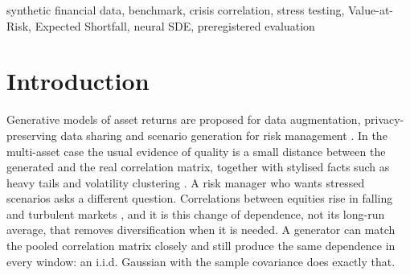 \documentclass[journal]{IEEEtran}
\newcommand{\pendingnum}{\textit{n/a}}
\providecommand{\nRiskGenerators}{\pendingnum}
\providecommand{\nAblationVariants}{\pendingnum}
\providecommand{\tauBCusHeldPrereg}{\pendingnum}
\providecommand{\tauBCkrHeldPrereg}{\pendingnum}
\providecommand{\tauRiskB}{\pendingnum}
\providecommand{\tauRiskBLo}{\pendingnum}
\providecommand{\tauRiskBHi}{\pendingnum}
\providecommand{\tauRiskC}{\pendingnum}
\providecommand{\tauRiskCLo}{\pendingnum}
\providecommand{\tauRiskCHi}{\pendingnum}
\providecommand{\scoreCCgnsdeTwoFull}{\pendingnum}
\providecommand{\scoreCCgnsdeTwoHeld}{\pendingnum}
\providecommand{\verdictGThree}{\pendingnum}
\begin{document}
\begin{abstract}
$\tau_{B,C}$ is below 0.3 on both the US ($\tauBCusHeldPrereg$) and Korea ($\tauBCkrHeldPrereg$). On the
downstream out-of-sample Value-at-Risk and Expected-Shortfall backtest over all \nRiskGenerators\ valid
generators (including three completed full-scale CUDA baselines alongside the preregistered panel, with TimeVAE
excluded for negative Expected Shortfall), family-C rank achieves $\tau = \tauRiskC\,[\tauRiskCLo,\tauRiskCHi]$
against FZ0 loss versus $\tau = \tauRiskB\,[\tauRiskBLo,\tauRiskBHi]$ for family~B: because the 95\%
bootstrap intervals do not overlap (\tauRiskCLo > \tauRiskBHi), gate~G3 is \verdictGThree\ under the strict non-overlap rule. As a case
study inside the benchmark, we document the preregistered latent neural SDE (CG-NSDE v1), which failed G1 and
G2, and a disclosed \emph{post hoc} revision (CG-NSDE v2) with \nAblationVariants\ component ablations. CG-NSDE
v2 (post hoc) leads family~C on NSE (\scoreCCgnsdeTwoFull\ in-sample) and ranks second among synthetic
generators on equal-weight VaR/ES FZ0 loss behind full-scale CUDA QuantGAN, yet degrades fivefold
out-of-sample (\scoreCCgnsdeTwoHeld) and, like every generator in the panel, fails held-out gate~G2 across
both evaluable stress episodes. Controlled checks further show that the boost statistic is compressed and
non-zero on a no-regime GARCH null. These checks leave the benchmark protocol and its mixed empirical findings
as the primary contribution.
\end{abstract}

\begin{IEEEkeywords}
synthetic financial data, benchmark, crisis correlation, stress testing, Value-at-Risk, Expected Shortfall,
neural SDE, preregistered evaluation
\end{IEEEkeywords}

\section{Introduction}
Generative models of asset returns are proposed for data augmentation, privacy-preserving data sharing and
scenario generation for risk management \cite{assefa2020synthetic,potluru2023synthetic,eckerli2021gans}. In the
multi-asset case the usual evidence of quality is a small distance between the generated and the real
correlation matrix, together with stylised facts such as heavy tails and volatility clustering
\cite{cont2001stylized}. A risk manager who wants stressed scenarios asks a different question. Correlations
between equities rise in falling and turbulent markets \cite{longin2001extreme,ang2002asymmetric}, and it is
this change of dependence, not its long-run average, that removes diversification when it is needed. A
generator can match the pooled correlation matrix closely and still produce the same dependence in every
window: an i.i.d. Gaussian with the sample covariance does exactly that.
\end{document}
